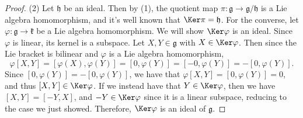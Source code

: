 \documentclass[11pt, letterpaper]{article}
\begin{document}
\begin{proof}
	(2) Let $\mathfrak{h} $ be an ideal. Then by (1), the quotient map $\pi : \mathfrak{g}  \to \mathfrak{g} /\mathfrak{h} $ is a Lie algebra homomorphism, and it's well known that $\Ker \pi =\mathfrak{h} $. For the converse, let $\varphi : \mathfrak{g}  \to \mathfrak{k} $ be a Lie algebra homomorphism.  We will show $\Ker \varphi $ is an ideal. Since $\varphi $ is linear, its kernel is a subspace. Let $X,Y\in \mathfrak{g} $ with $X\in \Ker \varphi $. Then since the Lie bracket is bilinear and $\varphi $ is a Lie algebra homomorphism,
	\[
		\varphi [X,Y]=[\varphi (X),\varphi (Y)]=[0,\varphi (Y)]=[-0,\varphi (Y)]=-[0,\varphi (Y)]
	.\]
	Since $[0,\varphi (Y)]=-[0,\varphi (Y)]$, we have that $\varphi [X,Y]=[0,\varphi (Y)]=0$, and thus $[X,Y]\in \Ker \varphi $. If we instead have that $Y\in \Ker \varphi $, then we have $[X,Y]=[-Y,X]$, and $-Y\in \Ker \varphi $ since it is a linear subspace, reducing to the case we just showed. Therefore, $\Ker \varphi $ is an ideal of $\mathfrak{g} $.
\end{proof}
\end{document}

